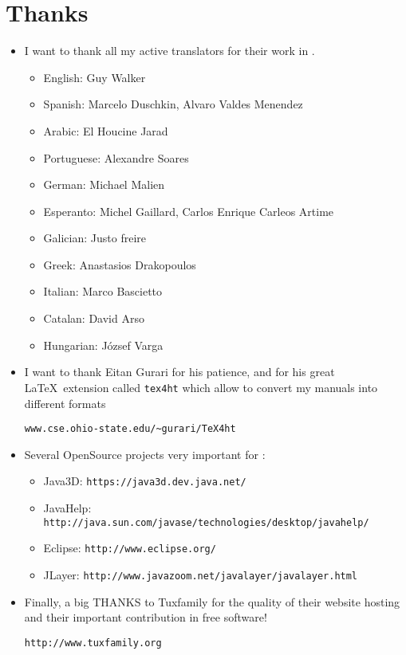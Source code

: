 \chapter*{Thanks}
\begin{itemize}
 \item I want to thank all my active translators for their work in \xlogo.\\
\vspace{0.2cm}
\begin{itemize}
\item English: Guy Walker
\item Spanish: Marcelo Duschkin, Alvaro Valdes Menendez
\item Arabic: El Houcine Jarad
\item Portuguese: Alexandre Soares
\item German: Michael Malien
\item Esperanto: Michel Gaillard, Carlos Enrique Carleos Artime
\item Galician: Justo freire
\item Greek: Anastasios Drakopoulos
\item Italian: Marco Bascietto
\item Catalan: David Arso 
\item Hungarian: József Varga
\end{itemize}
\vspace{0.5cm}
\item I want to thank  Eitan Gurari for his patience, and for his great \LaTeX\ extension called \texttt{tex4ht} which allow to convert my manuals into different formats  
\begin{center}
\texttt{www.cse.ohio-state.edu/\textasciitilde gurari/TeX4ht} 
\end{center}
\vspace{0.5cm}
\item Several OpenSource projects very important for \xlogo: \\
\vspace{0.2cm}
\begin{itemize}
 \item Java3D: \texttt{https://java3d.dev.java.net/} \\
\vspace{0.2cm}
 \item JavaHelp: \texttt{http://java.sun.com/javase/technologies/desktop/javahelp/} \\
\vspace{0.2cm}
 \item Eclipse: \texttt{http://www.eclipse.org/} \\
\vspace{0.2cm}
 \item JLayer: \texttt{http://www.javazoom.net/javalayer/javalayer.html} \\
\end{itemize}
\vspace{0.2cm}
\item Finally, a big THANKS to Tuxfamily for the quality of their website hosting and their important contribution in free software!
\begin{center}
 \texttt{http://www.tuxfamily.org}
\end{center}
\end{itemize}